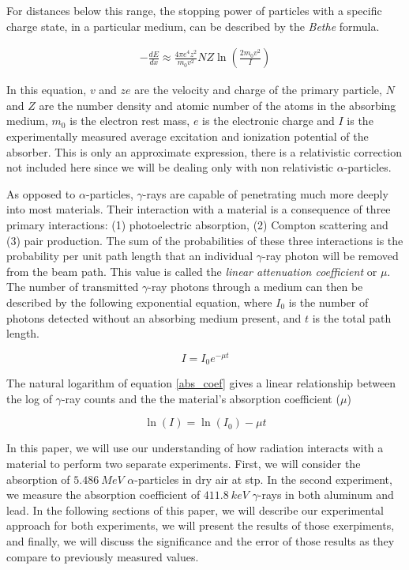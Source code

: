 \documentclass[10pt]{article}
\begin{document}
\begin{multicols}{2}
For distances below this range, the stopping power of particles with a specific charge state, in a particular medium, can be described by the \textit{Bethe} formula.

\begin{gather}
-\frac{dE}{dx} \approx \frac{4\pi e^{4}z^{2}}{m_{0}v^{2}}NZ \ln \left(\frac{2m_{0}v^{2}}{I}\right) \label{beth}
\end{gather}  

In this equation, $v$ and $ze$ are the velocity and charge of the primary particle, $N$ and $Z$ are the number density and atomic number of the atoms in the absorbing medium, $m_{0}$ is the electron rest mass, $e$ is the electronic charge and $I$ is the experimentally measured average excitation and ionization potential of the absorber.  This is only an approximate expression, there is a relativistic correction not included here since we will be dealing only with non relativistic $\alpha$-particles. \par 

As opposed to $\alpha$-particles, $\gamma$-rays are capable of penetrating much more deeply into most materials.  Their interaction with a material is a consequence of three primary interactions: (1) photoelectric absorption, (2) Compton scattering and (3) pair production.  The sum of the probabilities of these three interactions is the probability per unit path length that an individual $\gamma$-ray photon will be removed from the beam path.  This value is called the \textit{linear attenuation coefficient} or $\mu$.  The number of transmitted $\gamma$-ray photons through a medium can then be described by the following exponential equation, where $I_{0}$ is the number of photons detected without an absorbing medium present, and $t$ is the total path length.

\begin{equation}
	I = I_{0} e^{-\mu t} \label{abs_coef}
\end{equation}   

The natural logarithm of equation \ref{abs_coef} gives a linear relationship between the log of $\gamma$-ray counts and the the material's absorption coefficient ($\mu$)

\begin{equation}
	\ln \left(I\right) = \ln \left(I_{0}\right) -\mu t \label{log_coeff}
\end{equation}

In this paper, we will use our understanding of how radiation interacts with a material to perform two separate experiments.  First, we will consider the absorption of $5.486 \ MeV$ $\alpha$-particles in dry air at stp.  In the second experiment, we measure the absorption coefficient of $411.8 \ keV$ $\gamma$-rays in both aluminum and lead.  In the following sections of this paper, we will describe our experimental approach for both experiments, we will present the results of those exerpiments, and finally, we will discuss the significance and the error of those results as they compare to previously measured values.  \par 


\end{multicols}
\end{document}
